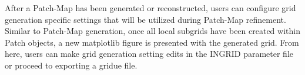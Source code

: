 After a Patch-Map has been generated or reconstructed, users can configure grid generation specific settings that will be utilized during Patch-Map refinement. Similar to Patch-Map generation, once all local subgrids have been created within Patch objects, a new matplotlib figure is presented with the generated grid. From here, users can make grid generation setting edits in the INGRID parameter file or proceed to exporting a gridue file.
